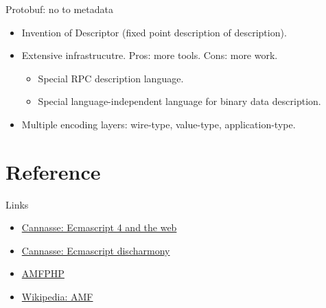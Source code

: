 \documentclass[presentation]{beamer}
\begin{document}
\begin{frame}[label={sec:orgeb2a4e4}]{Protobuf: no to metadata}
\begin{itemize}
\item Invention of Descriptor (fixed point description of description).
\item Extensive infrastrucutre.  Pros: more tools.  Cons: more work.
\begin{itemize}
\item Special RPC description language.
\item Special language-independent language for binary data
description.
\end{itemize}
\item Multiple encoding layers: wire-type, value-type,
application-type.
\end{itemize}
\end{frame}

\section{Reference}
\label{sec:orgd53f325}

\begin{frame}[label={sec:orgae4c088}]{Links}
\begin{itemize}
\item \href{http://ncannasse.fr/blog/ecmascript\_4\_and\_the\_web?lang=en}{Cannasse: Ecmascript 4 and the web}
\item \href{http://ncannasse.fr/blog/ecmascript\_disharmony?lang=en}{Cannasse: Ecmascript discharmony}
\item \href{https://www.silexlabs.org/amfphp/}{AMFPHP}
\item \href{https://en.wikipedia.org/wiki/Action\_Message\_Format}{Wikipedia: AMF}
\end{itemize}
\end{frame}
\end{document}
